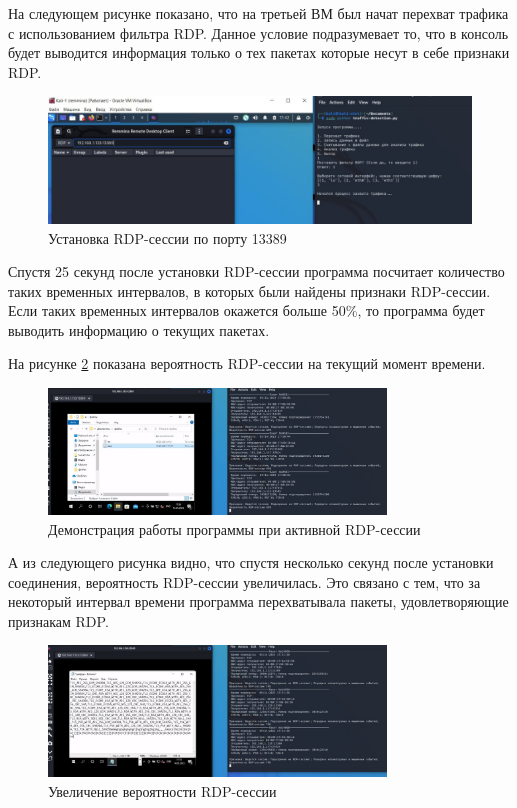 \documentclass[bachelor, och, coursework]{SCWorks}
\begin{document}
На следующем рисунке показано, что на третьей ВМ был начат перехват трафика с использованием фильтра RDP. Данное условие подразумевает то,
что в консоль будет выводится информация только о тех пакетах которые несут в себе признаки RDP.

\begin{figure}[H]
  \centering
  \includegraphics[width=1\textwidth]{photo/rdpport2.jpg}
  \caption{Установка RDP-сессии по порту 13389}
  \label{rdpport2}
\end{figure}

Спустя 25 секунд после установки RDP-сессии программа посчитает количество таких временных интервалов, в которых были найдены
признаки RDP-сессии. Если таких временных интервалов окажется больше 50\%, то программа будет выводить информацию о текущих пакетах.

На рисунке \ref{rdpport3} показана вероятность RDP-сессии на текущий момент времени.

\begin{figure}[H]
  \centering
  \includegraphics[width=0.8\textwidth]{photo/rdpport3.jpg}
  \caption{Демонстрация работы программы при активной RDP-сессии}
  \label{rdpport3}
\end{figure}

А из следующего рисунка видно, что спустя несколько секунд после установки соединения, вероятность RDP-сессии увеличилась.
Это связано с тем, что за некоторый интервал времени программа перехватывала пакеты, удовлетворяющие признакам RDP.


\begin{figure}[H]
  \centering
  \includegraphics[width=0.8\textwidth]{photo/rdpport4.jpg}
  \caption{Увеличение вероятности RDP-сессии}
  \label{rdpport4}
\end{figure}
\end{document}
